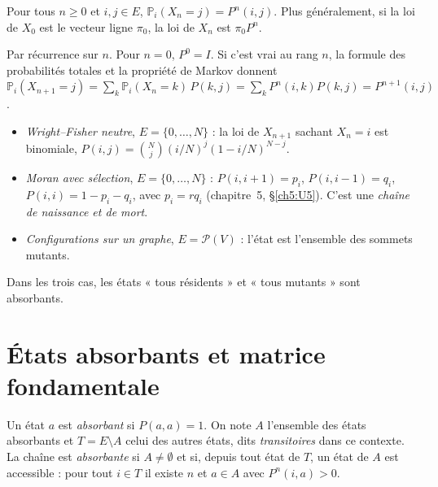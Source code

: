 \begin{proposition}\label{appB:prop:ck}
Pour tous $n\ge0$ et $i,j\in E$, $\mathbb P_i(X_n=j)=P^n(i,j)$. Plus généralement, si la loi de $X_0$ est le vecteur
ligne $\pi_0$, la loi de $X_n$ est $\pi_0P^n$.
\end{proposition}

\begin{humanproof}
Par récurrence sur $n$. Pour $n=0$, $P^0=I$. Si c'est vrai au rang $n$, la formule des probabilités totales et la
propriété de Markov donnent
$\mathbb P_i(X_{n+1}=j)=\sum_k\mathbb P_i(X_n=k)\,P(k,j)=\sum_kP^n(i,k)P(k,j)=P^{n+1}(i,j)$.
\end{humanproof}

\begin{example}
\begin{itemize}
\item \emph{Wright--Fisher neutre}, $E=\{0,\dots,N\}$ : la loi de $X_{n+1}$ sachant $X_n=i$ est binomiale,
$P(i,j)=\binom Nj(i/N)^j(1-i/N)^{N-j}$.
\item \emph{Moran avec sélection}, $E=\{0,\dots,N\}$ : $P(i,i+1)=p_i$, $P(i,i-1)=q_i$, $P(i,i)=1-p_i-q_i$, avec $p_i=rq_i$
(chapitre~5, §\ref{ch5:U5}). C'est une \emph{chaîne de naissance et de mort}.
\item \emph{Configurations sur un graphe}, $E=\mathcal P(V)$ : l'état est l'ensemble des sommets mutants.
\end{itemize}
Dans les trois cas, les états « tous résidents » et « tous mutants » sont absorbants.
\end{example}

\section{États absorbants et matrice fondamentale}\label{appB:sec:abs}

\begin{definition}
Un état $a$ est \emph{absorbant} si $P(a,a)=1$. On note $A$ l'ensemble des états absorbants et $T=E\setminus A$ celui
des autres états, dits \emph{transitoires} dans ce contexte. La chaîne est \emph{absorbante} si $A\ne\emptyset$ et si,
depuis tout état de $T$, un état de $A$ est accessible : pour tout $i\in T$ il existe $n$ et $a\in A$ avec $P^n(i,a)>0$.
\end{definition}

